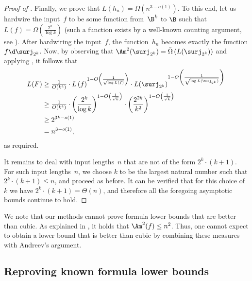 \documentclass{toc}
\begin{document}
\begin{proof}[Proof of ]
Finally, we prove that $L(h_{n})=\Omega(n^{3-o(1)})$. To this end,
let us hardwire the input~$f$ to be some function from~$\B^{k}$
to $\B$ such that $L(f)=\Omega(\frac{2^{k}}{\log k})$ (such a function
exists by a well-known counting argument, see \cite[Theorem 1.23]{JuknaBook}).
After hardwiring the input~$f$, the function~$h_{n}$ becomes exactly
the function $f\d\surj_{2^{k}}$. Now, by observing that $\Am^{2}(\surj_{2^{k}})=\tilde{\Omega}\left(L(\surj_{2^{k}})\right)$
and applying , it follows that 
\begin{align*}
L(F) & \ge\tfrac{1}{O(k^{4})}\cdot L\left(f\right)^{1-O\left(\frac{1}{\sqrt{\log L(f)}}\right)}\cdot L(\surj_{2^{k}})^{1-O\left(\frac{1}{\sqrt{\log L(\surj_{2^{k}})}}\right)}\\
 & \ge\tfrac{1}{O(k^{4})}\cdot\left(\frac{2^{k}}{\log k}\right)^{1-O\left(\frac{1}{\sqrt{k}}\right)}\cdot\left(\frac{2^{2k}}{k^{2}}\right)^{1-O\left(\frac{1}{\sqrt{k}}\right)}\\
 & \ge2^{3k-o(1)}\\
 & =n^{3-o(1)},
\end{align*}
as required.

It remains to deal with input lengths~$n$ that are not of the form
$2^{k}\cdot(k+1)$. For such input lengths~$n$, we choose $k$ to
be the largest natural number such that $2^{k}\cdot(k+1)\le n$, and
proceed as before. It can be verified that for this choice of~$k$
we have $2^{k}\cdot(k+1)=\Theta(n)$, and therefore all the
foregoing asymptotic bounds continue to hold. 
\end{proof}
\begin{remark}
We note that our methods cannot prove formula lower bounds that are
better than cubic. As explained in , 
it holds
that %
$\Am^2(f) \le n^{2}$.   %
Thus, one cannot expect
to obtain a lower bound that is better than cubic by combining these
measures with Andreev's argument. 
\end{remark}


\subsection{\label{subsec:known-results}Reproving known formula lower bounds}
\end{document}
